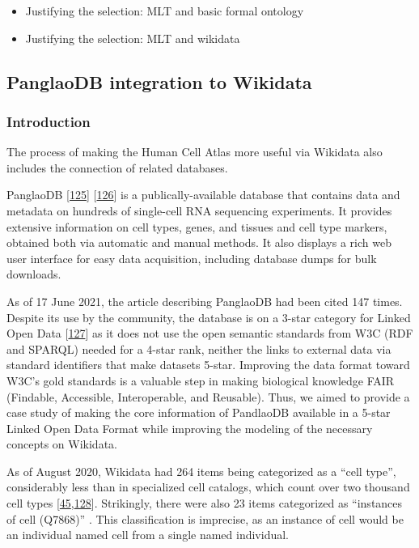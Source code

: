 \begin{itemize}
\item
  Justifying the selection: MLT and basic formal ontology
\item
  Justifying the selection: MLT and wikidata
\end{itemize}

\hypertarget{panglaodb-integration-to-wikidata}{%
\subsection{PanglaoDB integration to Wikidata}\label{panglaodb-integration-to-wikidata}}

\hypertarget{introduction-2}{%
\subsubsection{Introduction}\label{introduction-2}}

The process of making the Human Cell Atlas more useful via Wikidata also includes the connection of related databases.

PanglaoDB {[}\protect\hyperlink{ref-M0lqRYJb}{125}{]} {[}\protect\hyperlink{ref-T3PlZ3Vh}{126}{]} is a publically-available database that contains data and metadata on hundreds of single-cell RNA sequencing experiments.
It provides extensive information on cell types, genes, and tissues and cell type markers, obtained both via automatic and manual methods.
It also displays a rich web user interface for easy data acquisition, including database dumps for bulk downloads.

As of 17 June 2021, the article describing PanglaoDB had been cited 147 times.
Despite its use by the community, the database is on a 3-star category for Linked Open Data {[}\protect\hyperlink{ref-OGXYtGZ8}{127}{]} as it does not use the open semantic standards from W3C (RDF and SPARQL) needed for a 4-star rank, neither the links to external data via standard identifiers that make datasets 5-star.
Improving the data format toward W3C's gold standards is a valuable step in making biological knowledge FAIR (Findable, Accessible, Interoperable, and Reusable).
Thus, we aimed to provide a case study of making the core information of PandlaoDB available in a 5-star Linked Open Data Format while improving the modeling of the necessary concepts on Wikidata.

As of August 2020, Wikidata had 264 items being categorized as a ``cell type'', considerably less than in specialized cell catalogs, which count over two thousand cell types {[}\protect\hyperlink{ref-agnqfdk6}{45},\protect\hyperlink{ref-4AEy2xhQ}{128}{]}.
Strikingly, there were also 23 items categorized as ``instances of cell (Q7868)'' . This classification is imprecise, as an instance of cell would be an individual named cell from a single named individual.

